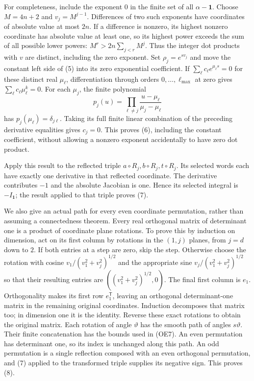 \documentclass[
  11pt,
]{article}
\begin{document}
For completeness, include the exponent \(0\) in the finite set of all
\(\alpha-\mathbf1\). Choose \(M=4n+2\) and \(v_j=M^{j-1}\). Differences
of two such exponents have coordinates of absolute value at most \(2n\).
If a difference is nonzero, its highest nonzero coordinate has absolute
value at least one, so its highest power exceeds the sum of all possible
lower powers: \(M^r>2n\sum_{j<r}M^j\). Thus the integer dot products
with \(v\) are distinct, including the zero exponent. Set
\(\rho_j=e^{sv_j}\) and move the constant left side of (5) into its zero
exponential coefficient. If \(\sum_\ell c_\ell e^{\mu_\ell s}=0\) for
these distinct real \(\mu_\ell\), differentiation through orders
\(0,\ldots,\ell_{\max}\) at zero gives \(\sum_\ell c_\ell\mu_\ell^k=0\).
For each \(\mu_j\), the finite polynomial \[
p_j(u)=\prod_{\ell\ne j}
                 \frac{u-\mu_\ell}{\mu_j-\mu_\ell}
\tag{OE9}
\] has \(p_j(\mu_\ell)=\delta_{j\ell}\). Taking its full finite linear
combination of the preceding derivative equalities gives \(c_j=0\). This
proves (6), including the constant coefficient, without allowing a
nonzero exponent accidentally to have zero dot product.

Apply this result to the reflected triple
\(a\circ R_j,b\circ R_j,t\circ R_j\). Its selected words each have
exactly one derivative in that reflected coordinate. The derivative
contributes \(-1\) and the absolute Jacobian is one. Hence its selected
integral is \(-I_{\mathbf1}\); the result applied to that triple proves
(7).

We also give an actual path for every even coordinate permutation,
rather than assuming a connectedness theorem. Every real orthogonal
matrix of determinant one is a product of coordinate plane rotations. To
prove this by induction on dimension, act on its first column by
rotations in the \((1,j)\) planes, from \(j=d\) down to \(2\). If both
entries at a step are zero, skip the step. Otherwise choose the rotation
with cosine \(v_1/(v_1^2+v_j^2)^{1/2}\) and the appropriate sine
\(v_j/(v_1^2+v_j^2)^{1/2}\) so that their resulting entries are
\(((v_1^2+v_j^2)^{1/2},0)\). The final first column is \(e_1\).
Orthogonality makes its first row \(e_1^{\mathsf T}\), leaving an
orthogonal determinant-one matrix in the remaining original coordinates.
Induction decomposes that matrix too; in dimension one it is the
identity. Reverse these exact rotations to obtain the original matrix.
Each rotation of angle \(\vartheta\) has the smooth path of angles
\(s\vartheta\). Their finite concatenation has the bounds used in (OE7).
An even permutation has determinant one, so its index is unchanged along
this path. An odd permutation is a single reflection composed with an
even orthogonal permutation, and (7) applied to the transformed triple
supplies its negative sign. This proves (8).
\end{document}
